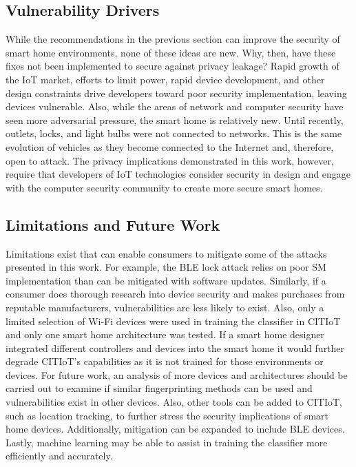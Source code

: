 \documentclass[journal]{./IEEEtran/IEEEtran}
\begin{document}
\subsection{Vulnerability Drivers}

While the recommendations in the previous section can improve the security of smart home environments, none of these ideas are new. Why, then, have these fixes not been implemented to secure against privacy leakage? Rapid growth of the \ac{IoT} market, efforts to limit power, rapid device development, and other design constraints drive developers toward poor security implementation, leaving devices vulnerable. Also, while the areas of network and computer security have seen more adversarial pressure, the smart home is relatively new. Until recently, outlets, locks, and light bulbs were not connected to networks. This is the same evolution of vehicles as they become connected to the Internet and, therefore, open to attack. The privacy implications demonstrated in this work, however, require that developers of \ac{IoT} technologies consider security in design and engage with the computer security community to create more secure smart homes.

\subsection{Limitations and Future Work}

Limitations exist that can enable consumers to mitigate some of the attacks presented in this work. For example, the \ac{BLE} lock attack relies on poor \ac{SM} implementation than can be mitigated with software updates. Similarly, if a consumer does thorough research into device security and makes purchases from reputable manufacturers, vulnerabilities are less likely to exist. Also, only a limited selection of Wi-Fi devices were used in training the classifier in \ac{CITIoT} and only one smart home architecture was tested. If a smart home designer integrated different controllers and devices into the smart home it would further degrade CITIoT's capabilities as it is not trained for those environments or devices. For future work, an analysis of more devices and architectures should be carried out to examine if similar fingerprinting methods can be used and vulnerabilities exist in other devices. Also, other tools can be added to CITIoT, such as location tracking, to further stress the security implications of smart home devices. Additionally, mitigation can be expanded to include \ac{BLE} devices. Lastly, machine learning may be able to assist in training the classifier more efficiently and accurately.
\end{document}
